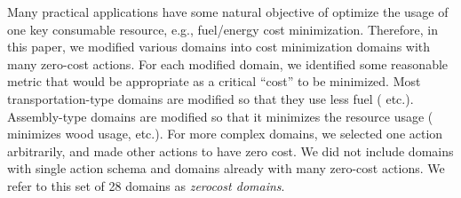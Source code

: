 
Many practical applications have some natural
objective of optimize the usage of one key consumable resource, e.g., fuel/energy cost minimization.
Therefore, in this paper, we modified various domains
into cost minimization domains with many zero-cost actions.
For each modified domain, we identified some reasonable metric that would be appropriate as a 
critical ``cost'' to be minimized.
Most transportation-type domains are modified so that they use less
fuel ( etc.). Assembly-type domains are modified so
that it minimizes the resource usage
( minimizes wood usage, etc.).
For more complex domains, we selected one action
arbitrarily, and made other actions to have zero cost. We did not
include domains with single action schema and domains already with many
zero-cost actions.
We refer to this set of 28 domains as \emph{zerocost domains}.


